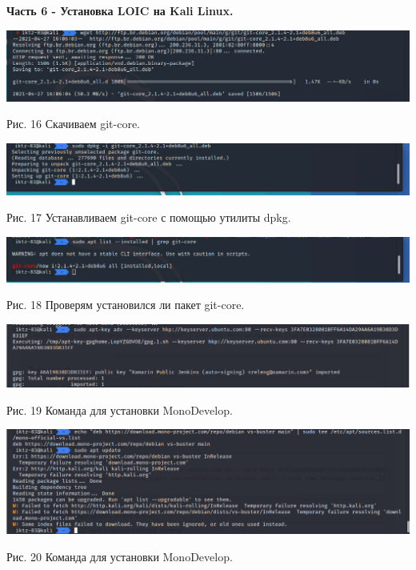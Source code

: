 \documentclass[a4paper,14pt]{extarticle}
\begin{document}
   \textbf{Часть 6 - Установка LOIC на Kali Linux.}
   \begin{center}
        \includegraphics[scale=0.45]{pics/16.png}

        Рис. 16 Скачиваем git-core.
        \vspace{1ex}

        \includegraphics[scale=0.45]{pics/17.png}

        Рис. 17 Устанавливаем git-core с помощью утилиты dpkg.
        \vspace{1ex}

        \includegraphics[scale=0.45]{pics/18.png}

        Рис. 18 Проверям установился ли пакет git-core.
        \vspace{1ex}

        \includegraphics[scale=0.45]{pics/19.png}

        Рис. 19 Команда для установки MonoDevelop.
        \vspace{1ex}

        \includegraphics[scale=0.45]{pics/20.png}

        Рис. 20 Команда для установки MonoDevelop.
        \vspace{1ex}


\end{center}
\end{document}
